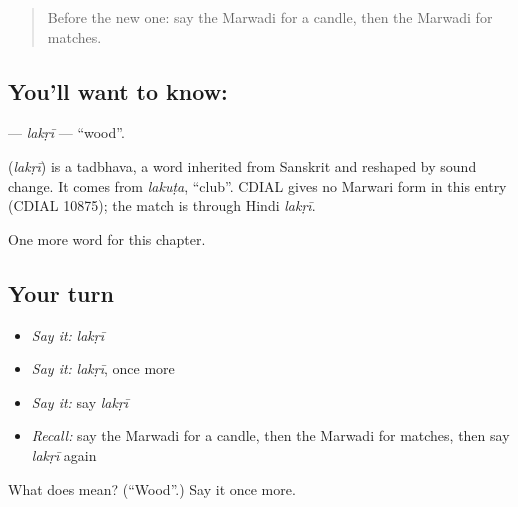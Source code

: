 \label{lesson:MW-C125-lakri}



\begin{quote}
Before the new one: say the Marwadi for a candle, then the Marwadi for matches.
\end{quote}

\subsection*{You'll want to know: }
\textbf{} — \emph{lakṛī} — \textquotedblleft{}wood\textquotedblright{}.

\begin{cousinweb}
\textbf{} (\emph{lakṛī}) is a tadbhava, a word inherited from Sanskrit and reshaped by sound change. It comes from \emph{lakuṭa}, \textquotedblleft{}club\textquotedblright{}. CDIAL gives no Marwari form in this entry (CDIAL 10875); the match is through Hindi \emph{lakṛī}.
\end{cousinweb}

\begin{grammarlens}[title={What you've built}]
One more word for this chapter.
\end{grammarlens}

\subsection*{Your turn}
\begin{itemize}
\raggedright
  \item \emph{Say it:} \emph{lakṛī}
  \item \emph{Say it:} \emph{lakṛī}, once more
  \item \emph{Say it:} say \emph{lakṛī}
  \item \emph{Recall:} say the Marwadi for a candle, then the Marwadi for matches, then say \emph{lakṛī} again
\end{itemize}

\begin{tcolorbox}[breakable,colback=teal!4,colframe=teal!35!black,title={Before you move on}]
What does  mean? (\textquotedblleft{}Wood\textquotedblright{}.) Say it once more.
\end{tcolorbox}
